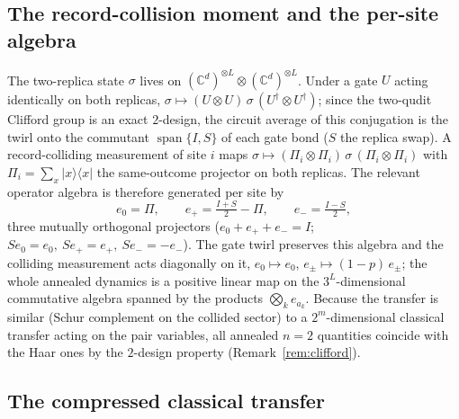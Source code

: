 \documentclass[11pt]{article}
\begin{document}
\subsection{The record-collision moment and the per-site algebra}
\label{sec:replica}

The two-replica state $\sigma$ lives on
$(\mathbb{C}^d)^{\otimes L}\otimes(\mathbb{C}^d)^{\otimes L}$.  Under a gate
$U$ acting identically on both replicas, $\sigma\mapsto(U\otimes
U)\,\sigma\,(U^\dagger\otimes U^\dagger)$; since the two-qudit Clifford group
is an exact $2$-design, the circuit average of this conjugation is the
twirl onto the commutant $\operatorname{span}\{I,S\}$ of each gate bond ($S$
the replica swap).  A record-colliding measurement of site $i$ maps
$\sigma\mapsto(\Pi_i\otimes\Pi_i)\,\sigma\,(\Pi_i\otimes\Pi_i)$ with
$\Pi_i=\sum_x|x\rangle\langle x|$ the same-outcome projector on both
replicas.  The relevant operator algebra is therefore generated per site by
\begin{equation}
  e_0=\Pi,\qquad e_+=\tfrac{I+S}{2}-\Pi,\qquad e_-=\tfrac{I-S}{2},
  \label{eq:Vdef}
\end{equation}
three mutually orthogonal projectors ($e_0+e_++e_-=I$;
$Se_0=e_0,\ Se_+=e_+,\ Se_-=-e_-$).  The gate twirl preserves this algebra
and the colliding measurement acts diagonally on it,
$e_0\mapsto e_0$, $e_\pm\mapsto(1-p)\,e_\pm$; the whole annealed dynamics is
a positive linear map on the $3^L$-dimensional commutative algebra spanned
by the products $\bigotimes_k e_{a_k}$.  Because the transfer is
similar (Schur complement on the collided sector) to a $2^m$-dimensional
classical transfer acting on the pair variables, all annealed $n=2$
quantities coincide with the Haar ones by the $2$-design property
(Remark~\ref{rem:clifford}).

\subsection{The compressed classical transfer}
\label{sec:compression}
\end{document}
